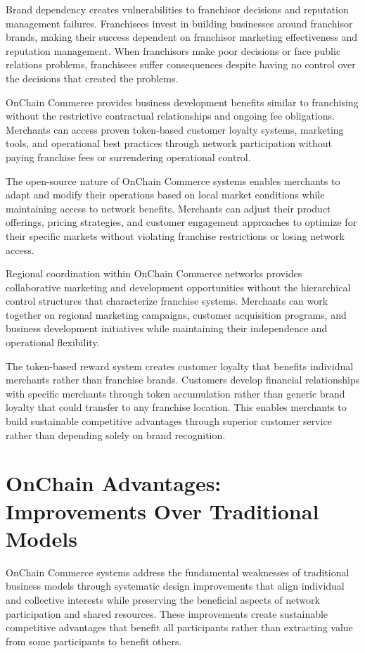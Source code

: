 \documentclass[
  Letterpaper,
]{scrbook}
\begin{document}
Brand dependency creates vulnerabilities to franchisor decisions and
reputation management failures. Franchisees invest in building
businesses around franchisor brands, making their success dependent on
franchisor marketing effectiveness and reputation management. When
franchisors make poor decisions or face public relations problems,
franchisees suffer consequences despite having no control over the
decisions that created the problems.

OnChain Commerce provides business development benefits similar to
franchising without the restrictive contractual relationships and
ongoing fee obligations. Merchants can access proven token-based
customer loyalty systems, marketing tools, and operational best
practices through network participation without paying franchise fees or
surrendering operational control.

The open-source nature of OnChain Commerce systems enables merchants to
adapt and modify their operations based on local market conditions while
maintaining access to network benefits. Merchants can adjust their
product offerings, pricing strategies, and customer engagement
approaches to optimize for their specific markets without violating
franchise restrictions or losing network access.

Regional coordination within OnChain Commerce networks provides
collaborative marketing and development opportunities without the
hierarchical control structures that characterize franchise systems.
Merchants can work together on regional marketing campaigns, customer
acquisition programs, and business development initiatives while
maintaining their independence and operational flexibility.

The token-based reward system creates customer loyalty that benefits
individual merchants rather than franchise brands. Customers develop
financial relationships with specific merchants through token
accumulation rather than generic brand loyalty that could transfer to
any franchise location. This enables merchants to build sustainable
competitive advantages through superior customer service rather than
depending solely on brand recognition.

\section{OnChain Advantages: Improvements Over Traditional
Models}\label{onchain-advantages-improvements-over-traditional-models}

OnChain Commerce systems address the fundamental weaknesses of
traditional business models through systematic design improvements that
align individual and collective interests while preserving the
beneficial aspects of network participation and shared resources. These
improvements create sustainable competitive advantages that benefit all
participants rather than extracting value from some participants to
benefit others.
\end{document}
